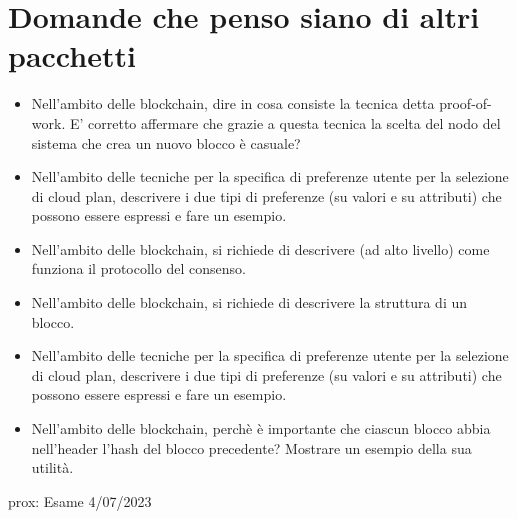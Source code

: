 \documentclass{report}
\begin{document}
\chapter{Domande che penso siano di altri pacchetti}
\begin{itemize}
    \item Nell'ambito delle blockchain, dire in cosa consiste la tecnica detta proof-of-work. E' corretto affermare che
grazie a questa tecnica la scelta del nodo del sistema che crea un nuovo blocco è casuale?
    \item Nell'ambito delle tecniche per la specifica di preferenze utente per la selezione di cloud plan, descrivere i due
tipi di preferenze (su valori e su attributi) che possono essere espressi e fare un esempio.
    \item Nell'ambito delle blockchain, si richiede di descrivere (ad alto livello) come funziona il protocollo del consenso.
    \item Nell'ambito delle blockchain, si richiede di descrivere la struttura di un blocco.
    \item Nell'ambito delle tecniche per la specifica di preferenze utente per la selezione di cloud plan, descrivere i due
tipi di preferenze (su valori e su attributi) che possono essere espressi e fare un esempio.
    \item Nell'ambito delle blockchain, perchè è importante che ciascun blocco abbia nell'header l'hash del blocco
precedente? Mostrare un esempio della sua utilità.
\end{itemize}


\noindent prox: Esame 4/07/2023 
\end{document}
